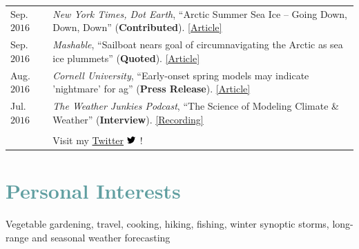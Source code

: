 \documentclass[margin,line,palatino,courier,10pt]{res}
\begin{document}
\begin{resume}
\begin{tabular}{@{}p{0.8in}p{4in}}
Sep. $2016$ & \textit{New York Times, Dot Earth}, ``Arctic Summer Sea Ice -- Going Down, Down, Down'' (\textbf{Contributed}). \href{http://dotearth.blogs.nytimes.com/2016/09/16/arctic-summer-sea-ice-going-down-down-down/?module=BlogPost-ReadMore&version=Blog\%20Main&action=Click&contentCollection=arctic&pgtype=Blogs&region=Body&_r=1#more-58318}{[Article]}\\
Sep. $2016$ & \textit{Mashable}, ``Sailboat nears goal of circumnavigating the Arctic as sea ice plummets'' (\textbf{Quoted}). \href{http://mashable.com/2016/09/01/sailboat-arctic-ice-melt-open-water/#s7nzft8m6sqB}{[Article]}\\
Aug. $2016$ & \textit{Cornell University}, ``Early-onset spring models may indicate 'nightmare' for ag'' (\textbf{Press Release}). \href{http://www.news.cornell.edu/stories/2016/08/early-onset-spring-models-may-indicate-nightmare-ag}{[Article]}\\
Jul. $2016$ & \textit{The Weather Junkies Podcast}, ``The Science of Modeling Climate \& Weather'' (\textbf{Interview}). \href{https://www.youtube.com/watch?v=vgT5P9zC91U}{[Recording]}\\\\

& Visit my \href{https://twitter.com/ZLabe}{Twitter} \includegraphics[height=9pt]{twitter.png}\ !\\
\end{tabular}


\vspace{-0.1in}
\noindent\makebox[\linewidth][r]{\rule{\textwidth}{5pt}}
\vspace{-0.3in}
\newpage
\section{\sc \textcolor{CadetBlue}{\large{Personal Interests}}}
Vegetable gardening, travel, cooking, hiking, fishing, winter synoptic storms, long-range and seasonal weather forecasting

\end{resume}
\end{document}
